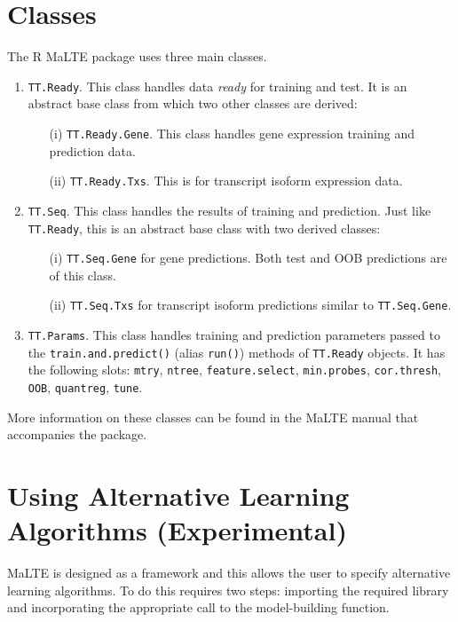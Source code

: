 \documentclass[a4paper,12pt]{article}
\begin{document}
\section{Classes}
\label{classes}
The \textsf{R} \textsf{MaLTE} package uses three main classes.
\begin{enumerate}
\item \texttt{TT.Ready}. This class handles data \textit{ready} for training and test. It is an abstract base class from which two other classes are derived:
\begin{enumerate}
\item[(i)] \texttt{TT.Ready.Gene}. This class handles gene expression training and prediction data.
\item[(ii)] \texttt{TT.Ready.Txs}. This is for transcript isoform expression data.
\end{enumerate}

\item \texttt{TT.Seq}. This class handles the results of training and prediction. Just like \texttt{TT.Ready}, this is an abstract base class with two derived classes:
\begin{enumerate}
\item[(i)] \texttt{TT.Seq.Gene} for gene predictions. Both test and OOB predictions are of this class.
\item[(ii)] \texttt{TT.Seq.Txs} for transcript isoform predictions similar to \texttt{TT.Seq.Gene}.
\end{enumerate}

\item \texttt{TT.Params}. This class handles training and prediction parameters passed to the \texttt{train.and.predict()} (alias \texttt{run()}) methods of \texttt{TT.Ready} objects. It has the following slots: \texttt{mtry}, \texttt{ntree}, \texttt{feature.select}, \texttt{min.probes}, \texttt{cor.thresh}, \texttt{OOB}, \texttt{quantreg}, \texttt{tune}.
\end{enumerate}

More information on these classes can be found in the \textsf{MaLTE} manual that accompanies the package.

\pagebreak
\section{Using Alternative Learning Algorithms (Experimental)}
\label{alternate_learner}
MaLTE is designed as a framework and this allows the user to specify alternative learning algorithms. To do this requires two steps: importing the required library and incorporating the appropriate call to the model-building function.
\end{document}
